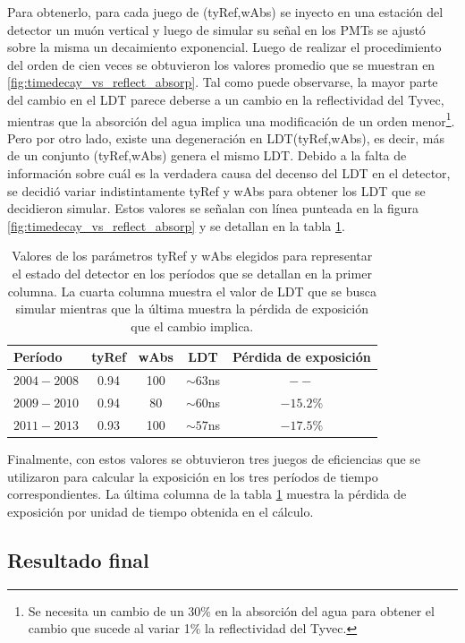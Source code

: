 	Para obtenerlo, para cada juego de (tyRef,wAbs) se inyecto en una estación del detector un muón vertical y luego de simular su señal en los PMTs se ajustó sobre la misma un decaimiento exponencial. Luego de realizar el procedimiento del orden de cien veces se obtuvieron los valores promedio que se muestran en \ref{fig:timedecay_vs_reflect_absorp}.
	Tal como puede observarse, la mayor parte del cambio en el LDT parece deberse a un cambio en la reflectividad del Tyvec, mientras que la absorción del agua implica una modificaci\'on de un orden menor\footnote{Se necesita un cambio de un $30\%$ en la absorción del agua para obtener el cambio que sucede al variar 1$\%$ la reflectividad del Tyvec.}.
	Pero por otro lado, existe una degeneración en LDT(tyRef,wAbs), es decir, más de un conjunto (tyRef,wAbs) genera el mismo LDT.
	Debido a la falta de información sobre cuál es la verdadera causa del decenso del LDT en el detector, se decidió variar indistintamente tyRef y wAbs para obtener los LDT que se decidieron simular.
	Estos valores se señalan con línea punteada en la figura \ref{fig:timedecay_vs_reflect_absorp} y se detallan en la tabla \ref{tab:ageingEffect}.
	\begin{table}[ht!]
	\centering
	\renewcommand{\arraystretch}{1.4}
	 \begin{tabular}{|l|ccc|c|}
				\hline
				Período       & tyRef & wAbs & LDT        &    Pérdida de exposición \\
				\hline
				$2004 - 2008$ & 0.94  & 100  & $\sim63$ns &    $--$ \\
				$2009 - 2010$ & 0.94  & 80   & $\sim60$ns &    $-15.2\%$\\
				$2011 - 2013$ & 0.93  & 100  & $\sim57$ns &    $-17.5\%$\\
				\hline
	 \end{tabular}
	 \caption{Valores de los parámetros tyRef y wAbs elegidos para representar el estado del detector en los períodos que se detallan en la primer columna. La cuarta columna muestra el valor de LDT que se busca simular mientras que la última muestra la pérdida de exposición que el cambio implica.}
	 \label{tab:ageingEffect}
	\end{table}
	Finalmente, con estos valores se obtuvieron tres juegos de eficiencias que se utilizaron para calcular la exposición en los tres períodos de tiempo correspondientes.
	La última columna de la tabla \ref{tab:ageingEffect} muestra la pérdida de exposición por unidad de tiempo obtenida en el cálculo.
	
	\subsection{Resultado final}
	

